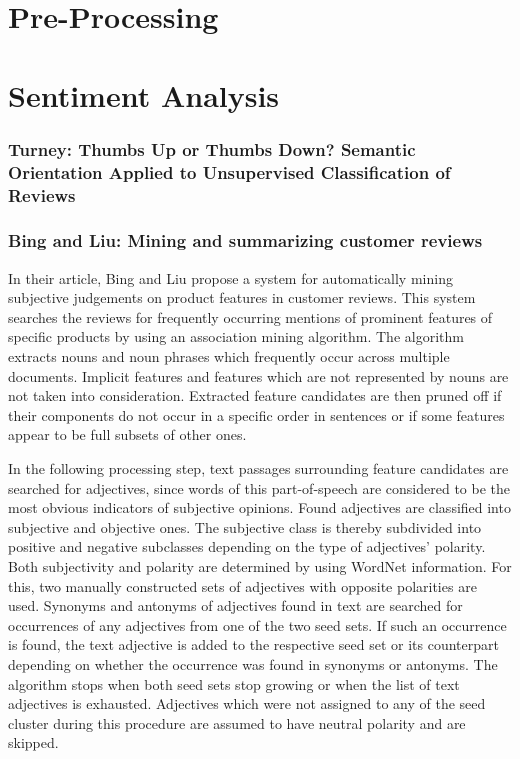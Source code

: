 \documentclass[a4paper,11pt]{article}
\begin{document}
\section{Pre-Processing}

\section{Sentiment Analysis}
\subsubsection{Turney: Thumbs Up or Thumbs Down? Semantic Orientation Applied to
               Unsupervised Classification of Reviews\cite{Turney02}}

\subsubsection{Bing and Liu: Mining and summarizing customer reviews\cite{Bing-Liu-04}}
In their article, Bing and Liu \cite{Bing-Liu-04} propose a system for
automatically mining subjective judgements on product features in customer
reviews.  This system searches the reviews for frequently occurring mentions
of prominent features of specific products by using an association mining
algorithm.  The algorithm extracts nouns and noun phrases which frequently
occur across multiple documents.  Implicit features and features which are not
represented by nouns are not taken into consideration.  Extracted feature
candidates are then pruned off if their components do not occur in a specific
order in sentences or if some features appear to be full subsets of other
ones.

In the following processing step, text passages surrounding feature candidates
are searched for adjectives, since words of this part-of-speech are considered
to be the most obvious indicators of subjective opinions.  Found adjectives
are classified into subjective and objective ones.  The subjective class is
thereby subdivided into positive and negative subclasses depending on the type
of adjectives' polarity.  Both subjectivity and polarity are determined by
using WordNet information.  For this, two manually constructed sets of
adjectives with opposite polarities are used.  Synonyms and antonyms of
adjectives found in text are searched for occurrences of any adjectives from
one of the two seed sets.  If such an occurrence is found, the text adjective
is added to the respective seed set or its counterpart depending on whether
the occurrence was found in synonyms or antonyms.  The algorithm stops when
both seed sets stop growing or when the list of text adjectives is exhausted.
Adjectives which were not assigned to any of the seed cluster during this
procedure are assumed to have neutral polarity and are skipped.
\end{document}
